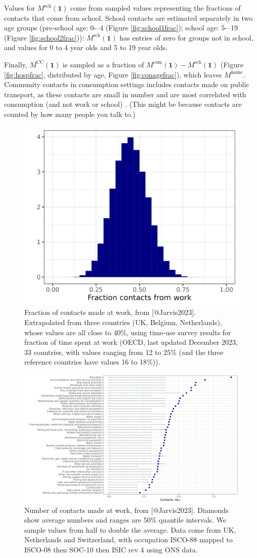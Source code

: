 \documentclass[
]{article}
\begin{document}
Values for \(M^{\text{sch}}(\textbf{1})\) come from sampled values representing the fractions of contacts that come from school. School contacts are estimated separately in two age groups (pre-school age: 0-\/--4 (Figure \ref{fig:school1frac}); school age: 5-\/--19 (Figure \ref{fig:school2frac})): \(M^{\text{sch}}(\textbf{1})\) has entries of zero for groups not in school, and values for 0 to 4 year olds and 5 to 19 year olds.

Finally, \(M^{\text{CC}}(\textbf{1})\) is sampled as a fraction of \(M^{\text{com}}(\textbf{1})- M^{\text{sch}}(\textbf{1})\) (Figure \ref{fig:hospfrac}, distributed by age, Figure \ref{fig:conagefrac}), which leaves \(M^{\text{home}}\). Community contacts in consumption settings includes contacts made on public transport, as these contacts are small in number and are most correlated with consumption (and not work or school) \citep{Jarvis2023}. (This might be because contacts are counted by how many people you talk to.)

\begin{figure}
\includegraphics[width=0.5\linewidth]{README_files/figure-gfm/workfrac} \caption{Fraction of contacts made at work, from [@Jarvis2023]. Extrapolated from three countries (UK, Belgium, Netherlands), whose values are all close to 40\%, using time-use survey results for fraction of time spent at work (OECD, last updated December 2023, 33 countries, with values ranging from 12 to 25\% (and the three reference countries have values 16 to 18\%)).}\label{fig:workfrac}
\end{figure}

\begin{figure}
\includegraphics[width=0.5\linewidth]{README_files/figure-gfm/allsector45} \caption{Number of contacts made at work, from [@Jarvis2023]. Diamonds show average numbers and ranges are 50\% quantile intervals. We sample values from half to double the average. Data come from UK, Netherlands and Switzerland, with occupation ISCO-88 mapped to ISCO-08 then SOC-10 then ISIC rev 4 using ONS data.}\label{fig:allsector}
\end{figure}
\end{document}
